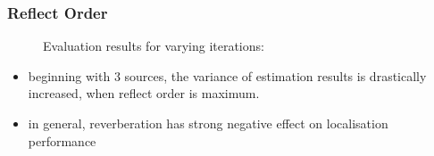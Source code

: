 \subsubsection{Reflect Order}


%	       
%	       

\begin{figure}[H]
    \setlength\figureheight{7cm}
    \small
    \setlength\figurewidth{\textwidth}
	\centering
	\begin{tikzpicture}
	    \footnotesize
	    
	    
	\end{tikzpicture}
	
	\caption[Evaluation results for varying  iterations]{Evaluation results for varying  iterations: }
	\label{fig:trial1}
\end{figure}

\begin{itemize}
    \item beginning with 3 sources, the variance of estimation results is drastically increased, when reflect order is maximum.
    \item in general, reverberation has strong negative effect on localisation performance
\end{itemize}
